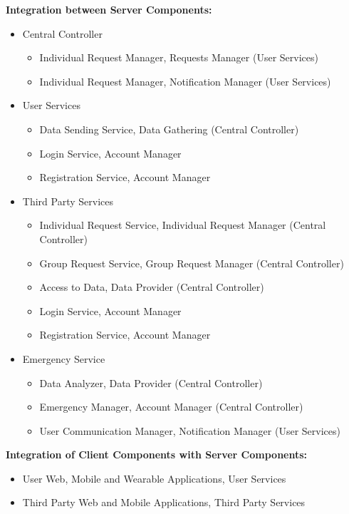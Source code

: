 \textbf{Integration between Server Components:}
\begin{itemize}
    \item Central Controller
    \begin{itemize}
        \item Individual Request Manager, Requests Manager (User Services)
        \item Individual Request Manager, Notification Manager (User Services)
    \end{itemize}
    \item User Services
    \begin{itemize}
        \item Data Sending Service, Data Gathering (Central Controller)
        \item Login Service, Account Manager
        \item Registration Service, Account Manager
    \end{itemize}
    \item Third Party Services
    \begin{itemize}
        \item Individual Request Service, Individual Request Manager (Central Controller)
        \item Group Request Service, Group Request Manager (Central Controller)
        \item Access to Data, Data Provider (Central Controller)
        \item Login Service, Account Manager
        \item Registration Service, Account Manager
    \end{itemize}
    \item Emergency Service
    \begin{itemize}
        \item Data Analyzer, Data Provider (Central Controller)
        \item Emergency Manager, Account Manager (Central Controller)
        \item User Communication Manager, Notification Manager (User Services)
    \end{itemize}
\end{itemize}

\textbf{Integration of Client Components with Server Components:}
\begin{itemize}
    \item User Web, Mobile and Wearable Applications, User Services
    \item Third Party Web and Mobile Applications, Third Party Services
\end{itemize}

